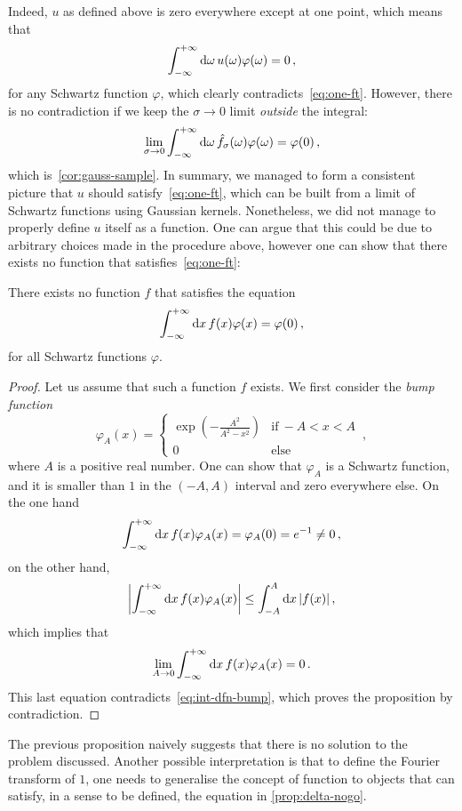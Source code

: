 Indeed, $u$ as defined above is zero everywhere except at one point, which means that
\begin{equation}
  \int_{-\infty}^{+\infty}\mathrm{d}{\omega}\,u(\omega)\varphi(\omega)=0\,,
\end{equation}
for any Schwartz function $\varphi$, which clearly contradicts~\cref{eq:one-ft}. However,
there is no contradiction if we keep the $\sigma\to 0$ limit \emph{outside} the integral:
\begin{equation}
  \lim_{\sigma\to 0}\int_{-\infty}^{+\infty}\mathrm{d}{\omega}\,\hat{f}_{\sigma}(\omega)\varphi(\omega)=\varphi(0)\,,
\end{equation}
which is~\cref{cor:gauss-sample}. In summary, we managed to form a consistent picture that
$u$ should satisfy~\cref{eq:one-ft}, which can be built from a limit of Schwartz functions
using Gaussian kernels. Nonetheless, we did not manage to properly define $u$ itself as a
function. One can argue that this could be due to arbitrary choices made in the procedure
above, however one can show that there exists no function that satisfies~\cref{eq:one-ft}:
\begin{proposition}
  \label{prop:delta-nogo}
  There exists no function $f$ that satisfies the equation
  \begin{equation}
    \int_{-\infty}^{+\infty}\mathrm{d}{x}\,f(x)\varphi(x)=\varphi(0)\,,
  \end{equation}
  for all Schwartz functions $\varphi$.
\end{proposition}
\begin{proof}
  Let us assume that such a function $f$ exists. We first consider the \emph{bump
  function}
  \begin{equation}
    \varphi_A(x)=
    \begin{cases}
      \exp(-\frac{A^2}{A^2-x^2})&\text{if}~-A<x<A\\
      0&\text{else}
    \end{cases}\,,
  \end{equation}
  where $A$ is a positive real number. One can show that $\varphi_A$ is a Schwartz
  function, and it is smaller than $1$ in the $(-A,A)$ interval and zero everywhere else.
  On the one hand
  \begin{equation}
    \int_{-\infty}^{+\infty}\mathrm{d}{x}\,f(x)\varphi_A(x)=\varphi_A(0)=e^{-1}\neq 0\,,
    \label{eq:int-dfn-bump}
  \end{equation}
  on the other hand,
  \begin{equation}
    \left|\int_{-\infty}^{+\infty}\mathrm{d}{x}\,f(x)\varphi_A(x)\right|\leq\int_{-A}^A\mathrm{d} x\,|f(x)|\,,
  \end{equation}
  which implies that
  \begin{equation}
    \lim_{A\to 0}\int_{-\infty}^{+\infty}\mathrm{d}{x}\,f(x)\varphi_A(x)=0\,.
  \end{equation}
  This last equation contradicts~\cref{eq:int-dfn-bump}, which proves the proposition by
  contradiction.
\end{proof}
The previous proposition naively suggests that there is no solution to the problem
discussed. Another possible interpretation is that to define the Fourier transform of $1$,
one needs to generalise the concept of function to objects that can satisfy, in a sense to
be defined, the equation in \cref{prop:delta-nogo}.

